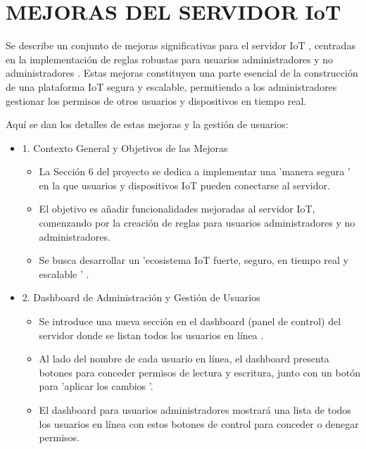 \documentclass{report}
\begin{document}
\section{MEJORAS DEL SERVIDOR IoT}
Se describe un conjunto de  mejoras significativas para el servidor IoT , centradas en la implementación de  reglas robustas para 
usuarios administradores y no administradores . Estas mejoras constituyen una parte esencial de la construcción de una plataforma IoT segura 
y escalable, permitiendo a los administradores gestionar los permisos de otros usuarios y dispositivos en tiempo real.

Aquí se dan los detalles de estas mejoras y la gestión de usuarios:
\begin{itemize}
    \item 1. Contexto General y Objetivos de las Mejoras
    \begin{itemize}
        \item La Sección 6 del proyecto se dedica a implementar una   'manera segura '  en la que usuarios y dispositivos IoT pueden conectarse 
        al servidor.
        \item El objetivo es  añadir funcionalidades mejoradas  al servidor IoT, comenzando por la creación de reglas para usuarios administradores 
        y no administradores.
        \item Se busca desarrollar un   'ecosistema IoT fuerte, seguro, en tiempo real y escalable ' .
    \end{itemize}

    \item 2. Dashboard de Administración y Gestión de Usuarios
    \begin{itemize}
        \item Se introduce una  nueva sección en el dashboard  (panel de control) del servidor donde se listan todos los  usuarios en línea .
        \item Al lado del nombre de cada usuario en línea, el dashboard presenta  botones para conceder permisos de lectura y escritura, junto con 
        un botón para  'aplicar los cambios '.
        \item El dashboard para usuarios administradores mostrará una lista de todos los usuarios en línea con estos botones de control para 
        conceder o denegar permisos.
    \end{itemize}


\end{itemize}
\end{document}
